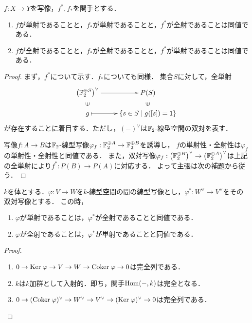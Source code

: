 \documentclass[uplatex,dvipdfmx]{jsreport}
\begin{document}
\begin{proposition}[全射・単射の特徴付け]\label{prop-dual-maps}
    $f:X\to Y$を写像，$f^*,f_*$を関手とする．
    \begin{enumerate}
        \item $f$が単射であることと，$f_*$が単射であることと，$f^*$が全射であることは同値である．
        \item $f$が全射であることと，$f_*$が全射であることと，$f^*$が単射であることは同値である．
    \end{enumerate}
\end{proposition}
\begin{proof}
    まず，$f^*$について示す．$f_*$についても同様．
    集合$S$に対して，全単射
    \[\xymatrix@R-2pc{
        \paren{\bF_2^{\oplus S}}^\vee\ar[r]&P(S)\\
        \rotatebox[origin=c]{90}{$\in$}&\rotatebox[origin=c]{90}{$\in$}\\
        g\ar@{|->}[r]&\{s\in S\mid g([s])=1\}
    }\]
    が存在することに着目する．ただし，$(-)^\vee$は$\mathbb{F}_2$-線型空間の双対を表す．

    写像$f:A\to B$は$\mathbb{F}_2$-線型写像$\varphi_f:\mathbb{F}_2^{\oplus A}\to\mathbb{F}_2^{\oplus B}$を誘導し，
    $f$の単射性・全射性は$\varphi_f$の単射性・全射性と同値である．
    また，双対写像$\varphi_f:\left(\mathbb{F}_2^{\oplus B}\right)^\vee\to\left(\mathbb{F}_2^{\oplus A}\right)^\vee$は上記の全単射により$f^*:P(B)\to P(A)$に対応する．
    よって主張は次の補題から従う．
\end{proof}

\begin{lemma}
    $k$を体とする．$\varphi:V\to W$を$k$-線型空間の間の線型写像とし，$\varphi^*:W^\vee\to V^\vee$をその双対写像とする．
    この時，
    \begin{enumerate}
        \item $\varphi$が単射であることは，$\varphi^*$が全射であることと同値である．
        \item $\varphi$が全射であることは，$\varphi^*$が単射であることと同値である．
    \end{enumerate}
\end{lemma}
\begin{proof}\mbox{}
    \begin{enumerate}
        \item $0\to\mathrm{Ker}\;\varphi\to V\to W\to\mathrm{Coker}\;\varphi\to 0$は完全列である．
        \item $k$は$k$加群として入射的．即ち，関手$\mathrm{Hom}(-,k)$は完全となる．
        \item $0\to(\mathrm{Coker}\;\varphi)^\vee\to W^\vee\to V^\vee\to(\mathrm{Ker}\;\varphi)^\vee\to 0$は完全列である．
    \end{enumerate}
\end{proof}
\end{document}
